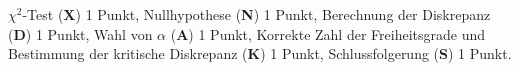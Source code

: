 \begin{bewertung}
$\chi^2$-Test ({\bf X}) 1 Punkt,
Nullhypothese ({\bf N}) 1 Punkt,
Berechnung der Diskrepanz ({\bf D}) 1 Punkt,
Wahl von $\alpha$ ({\bf A}) 1 Punkt,
Korrekte Zahl der Freiheitsgrade und Bestimmung der kritische Diskrepanz
({\bf K}) 1 Punkt,
Schlussfolgerung ({\bf S}) 1 Punkt.
\end{bewertung}

